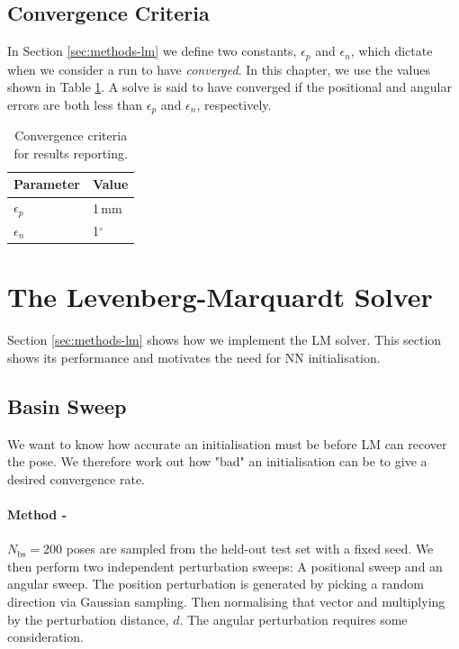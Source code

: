 \subsection{Convergence Criteria}\label{sec:conv_criteria}
In Section \ref{sec:methods-lm} we define two constants, $\epsilon_p$ and $\epsilon_n$, which dictate when we consider a run to have \emph{converged}. In this chapter, we use the values shown in Table \ref{tab:conv_criteria}. A solve is said to have converged if the positional and angular errors are both less than $\epsilon_p$ and $\epsilon_n$, respectively.

\begin{table}
  \centering
  \begin{tabular}{ll}
    \toprule
    Parameter & Value \\
    \midrule
    $\epsilon_p$  & 1\,mm \\
    $\epsilon_n$ & 1$^\circ$ \\
    \bottomrule
  \end{tabular}
  \caption{Convergence criteria for results reporting.}
  \label{tab:conv_criteria}
\end{table}

\section{The Levenberg-Marquardt Solver}\label{sec:results-lm}
Section \ref{sec:methods-lm} shows how we implement the LM solver. This section shows its performance and motivates the need for NN initialisation.

\subsection{Basin Sweep}
We want to know how accurate an initialisation must be before LM can recover the pose. We therefore work out how "bad" an initialisation can be to give a desired convergence rate. 
\paragraph{Method -} $N_{\mathrm{bs}} = 200$ poses are sampled from the held-out test set with a fixed seed. We then perform two independent perturbation sweeps: A positional sweep and an angular sweep. The position perturbation is generated by picking a random direction via Gaussian sampling. Then normalising that vector and multiplying by the perturbation distance, $d$. The angular perturbation requires some consideration. 

